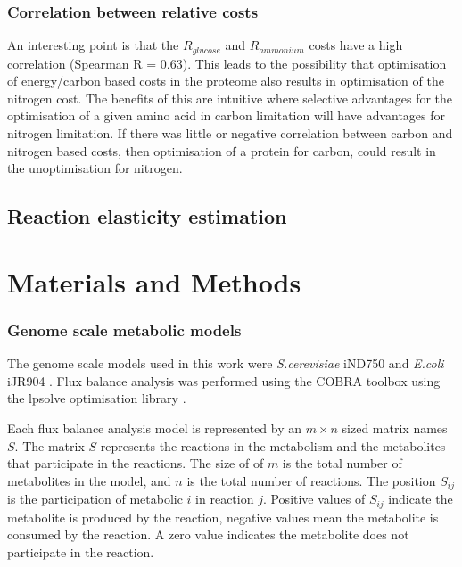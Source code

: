 \subsubsection{Correlation between relative costs}

An interesting point is that the $R_{glucose}$ and $R_{ammonium}$ costs have a high correlation (Spearman R = 0.63). This leads to the possibility that optimisation of energy/carbon based costs in the proteome also results in optimisation of the nitrogen cost. The benefits of this are intuitive where selective advantages for the optimisation of a given amino acid in carbon limitation will have advantages for nitrogen limitation. If there was little or negative correlation between carbon and nitrogen based costs, then optimisation of a protein for carbon, could result in the unoptimisation for nitrogen.

\subsection{Reaction elasticity estimation}

\section{Materials and Methods}

\subsubsection{Genome scale metabolic models}

The genome scale models used in this work were \emph{S.cerevisiae} iND750 \cite{duarte2004a} and \emph{E.coli} iJR904 \cite{reed2003}. Flux balance analysis was performed using the COBRA toolbox \cite{becker2007} using the lpsolve optimisation library \cite{lpsolve}.

Each flux balance analysis model is represented by an $m \times n$ sized matrix names $S$. The matrix $S$ represents the reactions in the metabolism and the metabolites that participate in the reactions. The size of of $m$ is the total number of metabolites in the model, and $n$ is the total number of reactions. The position $S_{ij}$ is the participation of metabolic $i$ in reaction $j$. Positive values of $S_{ij}$ indicate the metabolite is produced by the reaction, negative values mean the metabolite is consumed by the reaction. A zero value indicates the metabolite does not participate in the reaction.

